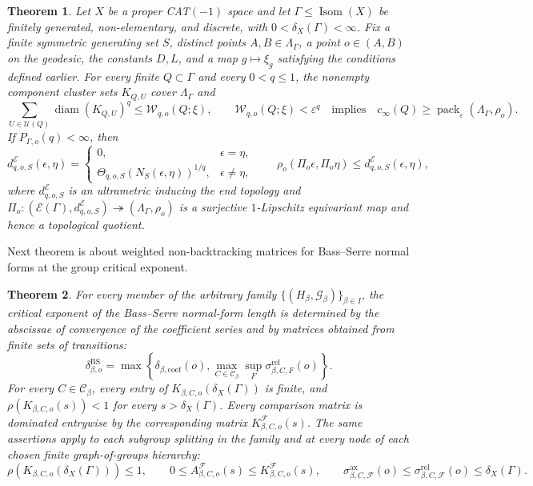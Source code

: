 \documentclass[11pt]{article}
\newtheorem{theorem}{Theorem}[section]
\theoremstyle{definition}
\newcommand{\Isom}{\operatorname{Isom}}
\newcommand{\diam}{\operatorname{diam}}
\newcommand{\pack}{\operatorname{pack}}
\newcommand{\EdgeSum}{\mathcal W}
\newcommand{\coef}{\mathrm{coef}}
\newcommand{\BS}{\mathrm{BS}}
\newcommand{\ax}{\mathrm{ax}}
\newcommand{\rel}{\mathrm{rel}}
\begin{document}
\begin{theorem}
\label{thm:finite-vertex-deletion-main}
Let $X$ be a proper CAT$(-1)$ space and let $\Gamma\le\Isom(X)$ be finitely generated,
non-elementary, and discrete, with $0<\delta_X(\Gamma)<\infty$.  Fix a finite symmetric
generating set $S$, distinct points $A,B\in\Lambda_\Gamma$, a point $o\in(A,B)$ on the geodesic, the constants $D,L$, and a map $g\mapsto\xi_g$ satisfying the conditions defined earlier.  For every finite
$Q\subset\Gamma$ and every $0<q\le1$, the nonempty component cluster sets
$K_{Q,U}$ cover $\Lambda_\Gamma$ and
\begin{equation}\label{eq:main-finite-vertex-deletion-bound}
 \sum_{U\in\mathscr U(Q)}\diam(K_{Q,U})^q\le \EdgeSum_{q,o}(Q;\xi),
 \qquad
 \EdgeSum_{q,o}(Q;\xi)<\varepsilon^q
 \quad\mbox{implies}\quad
 c_\infty(Q)\ge\pack_\varepsilon(\Lambda_\Gamma,\rho_o).
\end{equation}
If $P_{\Gamma,o}(q)<\infty$, then
\begin{equation}\label{eq:main-tail-ultrametric}
 d^{\mathcal E}_{q,o,S}(\epsilon,\eta)=
 \begin{cases}
 0,&\epsilon=\eta,\\
 \Theta_{q,o,S}(N_S(\epsilon,\eta))^{1/q},&\epsilon\ne\eta,
 \end{cases}
 \qquad
 \rho_o(\Pi_o\epsilon,\Pi_o\eta)\le d^{\mathcal E}_{q,o,S}(\epsilon,\eta),
\end{equation}
where $d^{\mathcal E}_{q,o,S}$ is an ultrametric inducing the end topology and
$\Pi_o:(\mathcal E(\Gamma),d^{\mathcal E}_{q,o,S})\twoheadrightarrow
(\Lambda_\Gamma,\rho_o)$ is a surjective $1$-Lipschitz equivariant map and hence a topological quotient.
\end{theorem}
Next theorem is about weighted non-backtracking matrices for Bass--Serre normal forms at the group critical exponent.
\begin{theorem}
\label{thm:bass-serre-main}
For every member of the arbitrary family
$\{(H_\beta,\mathcal G_\beta)\}_{\beta\in I}$, the critical exponent of the Bass--Serre normal-form length is determined by the abscissae
of convergence of the coefficient series and by matrices obtained from finite sets of
transitions:
\begin{equation}\label{eq:main-finite-recovery}
 \delta^{\BS}_{\beta,o}=
 \max\left\{\delta_{\beta,\coef}(o),
 \max_{C\in\mathscr C_\beta}\sup_F
 \sigma^{\rel}_{\beta,C,F}(o)\right\}.
\end{equation}
For every $C\in\mathscr C_\beta$, every entry of
$K_{\beta,C,o}(\delta_X(\Gamma))$ is finite, and
$\rho(K_{\beta,C,o}(s))<1$ for every $s>\delta_X(\Gamma)$.  Every comparison matrix is
dominated entrywise by the corresponding matrix $K^{\mathcal F}_{\beta,C,o}(s)$.  The same assertions apply to each subgroup splitting in the
family and at every node of each chosen finite graph-of-groups hierarchy:
\begin{equation}\label{eq:main-transfer-comparison}
 \rho\!\left(K_{\beta,C,o}(\delta_X(\Gamma))\right)\le1,
 \qquad
 0\le A^{\mathcal F}_{\beta,C,o}(s)\le K^{\mathcal F}_{\beta,C,o}(s),
 \qquad
 \sigma^{\ax}_{\beta,C,\mathcal F}(o)
 \le\sigma^{\rel}_{\beta,C,\mathcal F}(o)
 \le\delta_X(\Gamma).
\end{equation}
\end{theorem}
\end{document}
